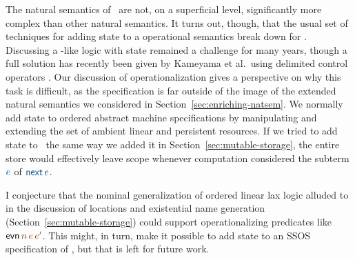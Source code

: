 The natural semantics of \rowan~are not, on a superficial level,
significantly more complex than other natural semantics.  It turns out,
though,
that the usual set of techniques for adding state to a operational
semantics break down for \rowan. Discussing a \rowan-like logic with
state remained a challenge for many years, though a full solution has
recently been given by Kameyama et al.~using delimited control
operators \cite{kameyama11shifting}. Our discussion of
operationalization gives a perspective on why this task is difficult,
as the specification is far outside of the image of the extended
natural semantics we considered in Section~\ref{sec:enriching-natsem}.
We normally add state to ordered abstract machine specifications by
manipulating and extending the set of ambient linear and persistent
resources.  If we tried to add state to \rowan~the same way we added
it in Section~\ref{sec:mutable-storage}, the entire store would
effectively leave scope whenever computation considered the subterm
$\obj{e}$ of $\obj{{\sf next}\,e}$.

I conjecture that the nominal generalization of ordered linear lax
logic alluded to in the discussion of locations and existential name
generation (Section~\ref{sec:mutable-storage}) could support
operationalizing predicates like ${\sf
  evn}\,\lf{n}\,\lf{e}\,\lf{e'}$. This might, in turn, make it
possible to add state to an SSOS specification of \rowan, but that is
left for future work.
